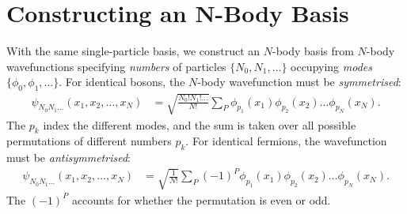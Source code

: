 \documentclass[a4paper, 11pt, normalem]{report}
\begin{document}
\section{Constructing an N-Body Basis}
With the same single-particle basis, we construct an $N$-body basis from $N$-body wavefunctions specifying \emph{numbers} of particles $\{N_0,N_1,\dots\}$ occupying \emph{modes} $\{\phi_0,\phi_1,\dots\}$.
For identical bosons, the $N$-body wavefunction must be \emph{symmetrised}:
\begin{align}
    \psi_{N_0 N_1\dots}(x_1,x_2,\dots,x_N) &= \sqrt{\frac{N_0!N_1!\dots}{N!}}\sum_P \phi_{p_1}(x_1)\phi_{p_2}(x_2)\dots\phi_{p_N}(x_N).
\end{align}
The $p_k$ index the different modes, and the sum is taken over all possible permutations of different numbers $p_k$.
For identical fermions, the wavefunction must be \emph{antisymmetrised}:
\begin{align}
    \psi_{N_0 N_1\dots}(x_1,x_2,\dots,x_N) &= \sqrt{\frac{1}{N!}}\sum_P (-1)^P \phi_{p_1}(x_1)\phi_{p_2}(x_2)\dots\phi_{p_N}(x_N).
\end{align}
The $(-1)^P$ accounts for whether the permutation is even or odd.
\end{document}

